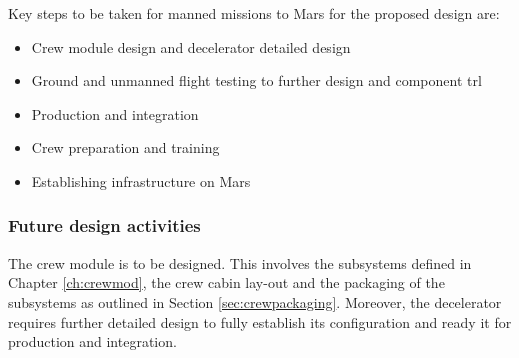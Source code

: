 Key steps to be taken for manned missions to Mars for the proposed design are:
\begin{itemize}
\item Crew module design and decelerator detailed design
\item Ground and unmanned flight testing to further design and component \acrfull{trl}
\item Production and integration
\item Crew preparation and training
\item Establishing infrastructure on Mars
\end{itemize}

\subsubsection{Future design activities}
The crew module is to be designed. This involves the subsystems defined in Chapter \ref{ch:crewmod}, the crew cabin lay-out and the packaging of the subsystems as outlined in Section \ref{sec:crewpackaging}. Moreover, the decelerator requires further detailed design to fully establish its configuration and ready it for production and integration. 


